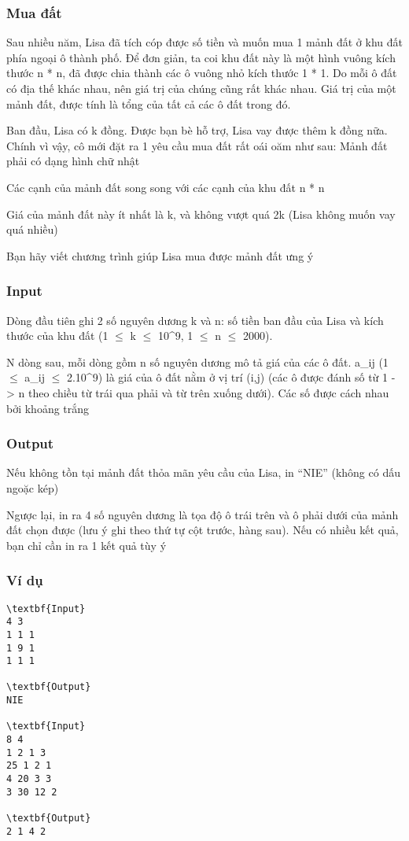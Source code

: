 



\subsubsection{   Mua đất  }

   Sau nhiều năm, Lisa đã tích cóp được số tiền và muốn mua 1 mảnh đất ở khu đất phía ngoại ô thành phố. Để đơn giản, ta coi khu đất này là một hình vuông kích thước n * n, đã được chia thành các ô vuông nhỏ kích thước 1 * 1. Do mỗi ô đất có địa thế khác nhau, nên giá trị của chúng cũng rất khác nhau. Giá trị của một mảnh đất, được tính là tổng của tất cả các ô đất trong đó.  

   Ban đầu, Lisa có k đồng. Được bạn bè hỗ trợ, Lisa vay được thêm k đồng nữa. Chính vì vậy, cô mới đặt ra 1 yêu cầu mua đất rất oái oăm như sau: Mảnh đất phải có dạng hình chữ nhật  

   Các cạnh của mảnh đất song song với các cạnh của khu đất n * n  

   Giá của mảnh đất này ít nhất là k, và không vượt quá 2k (Lisa không muốn vay quá nhiều)  

   Bạn hãy viết chương trình giúp Lisa mua được mảnh đất ưng ý  

\subsubsection{   Input  }

   Dòng đầu tiên ghi 2 số nguyên dương k và n: số tiền ban đầu của Lisa và kích thước của khu đất (1  $\le$  k  $\le$  10^9, 1  $\le$  n  $\le$  2000).  

   N dòng sau, mỗi dòng gồm n số nguyên dương mô tả giá của các ô đất. a\_ij (1  $\le$  a­\_ij  $\le$  2.10^9) là giá của ô đất nằm ở vị trí (i,j) (các ô được đánh số từ 1 -> n theo chiều từ trái qua phải và từ trên xuống dưới). Các số được cách nhau bởi khoảng trắng  

\subsubsection{   Output  }

   Nếu không tồn tại mảnh đất thỏa mãn yêu cầu của Lisa, in “NIE” (không có dấu ngoặc kép)  

   Ngược lại, in ra 4 số nguyên dương là tọa độ ô trái trên và ô phải dưới của mảnh đất chọn được (lưu ý ghi theo thứ tự cột trước, hàng sau). Nếu có nhiều kết quả, bạn chỉ cần in ra 1 kết quả tùy ý  

\subsubsection{   Ví dụ  }
\begin{verbatim}
\textbf{Input}
4 3
1 1 1
1 9 1
1 1 1

\textbf{Output}
NIE

\textbf{Input}
8 4
1 2 1 3
25 1 2 1
4 20 3 3
3 30 12 2

\textbf{Output}
2 1 4 2
\end{verbatim}
